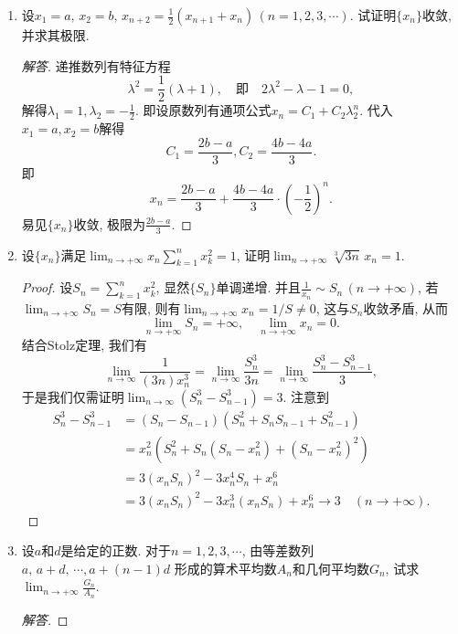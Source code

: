 \begin{2a}
\begin{enumerate}
\begin{proof}
若\(\ell=-\infty\), 我们记\(z_n=-x_n\), 于是\(\lim_{n\rightarrow\infty}z_n=0\)且
\[\lim_{n\rightarrow\infty}\frac{z_n-z_{n-1}}{y_n-y_{n-1}}=+\infty,\]
由上一段的讨论知\(\lim_{n\rightarrow\infty}\frac{z_n}{y_n}=+\infty\), 
从而\(\lim_{n\rightarrow\infty}\frac{x_n}{y_n}=-\infty.\)
\end{proof}
\item 设\(x_1=a,\,x_2=b,\,x_{n+2}=\frac{1}{2}(x_{n+1}+x_n)\,(n=1,2,3,\cdots)\). 试证明\(\{x_n\}\)收敛, 并求其极限.
\begin{proof}[解答]
递推数列有特征方程
\[\lambda^2=\frac{1}{2}(\lambda+1),\quad\text{即}\quad 2\lambda^2-\lambda-1=0,\]
解得\(\lambda_1=1,\lambda_2=-\frac{1}{2}\). 
即设原数列有通项公式\(x_n=C_1+C_2\lambda_2^n\). 代入\(x_1=a,x_2=b\)解得
\[C_1=\frac{2b-a}{3},C_2=\frac{4b-4a}{3}.\] 
即\[x_n=\frac{2b-a}{3}+\frac{4b-4a}{3}\cdot\left(-\frac{1}{2}\right)^n.\] 
易见\(\{x_n\}\)收敛, 极限为\(\frac{2b-a}{3}\).
\end{proof}
\item 设\(\{x_n\}\)满足\(\lim_{n\rightarrow+\infty}x_{n}\sum_{k=1}^{n}x_k^2=1\), 
证明\(\lim_{n\rightarrow+\infty}\sqrt[3]{3n}\,x_{n}=1\).
\begin{proof}
设\(S_n=\sum_{k=1}^{n}x_k^2\), 显然\(\{S_n\}\)单调递增. 
并且\(\frac{1}{x_n}\sim S_n\,(n\rightarrow+\infty)\), 
若\(\lim_{n\rightarrow+\infty}S_n=S\)有限, 
则有\(\lim_{n\rightarrow+\infty}x_n=1/S\ne 0\), 这与\(S_n\)收敛矛盾, 
从而\[\lim_{n\rightarrow+\infty}S_n=+\infty,\quad\lim_{n\rightarrow+\infty}x_n=0.\]
结合Stolz定理, 我们有\[\lim_{n\rightarrow\infty}\frac{1}{(3n)x_n^3}
=\lim_{n\rightarrow\infty}\frac{S_n^3}{3n}
=\lim_{n\rightarrow\infty}\frac{S_n^3-S_{n-1}^3}{3},\]
于是我们仅需证明\(\lim_{n\rightarrow\infty}\left(S_n^3-S_{n-1}^3\right)=3\). 
注意到\[\begin{aligned}
S_n^3-S_{n-1}^3&=(S_n-S_{n-1})\left(S_n^2+S_nS_{n-1}+S_{n-1}^2\right)\\
&=x_n^2\left(S_n^2+S_n\left(S_n-x_n^2\right)+\left(S_n-x_n^2\right)^2\right)\\
&=3\left(x_nS_n\right)^2-3x_n^4S_n+x_n^6\\
&=3\left(x_nS_n\right)^2-3x_n^3\left(x_nS_n\right)+x_n^6\rightarrow3\quad (n\rightarrow +\infty).
\end{aligned}\]
\end{proof}
\item 设\(a\)和\(d\)是给定的正数. 对于\(n=1,2,3,\cdots\), 
由等差数列\(a,\,a+d,\,\cdots,a+(n-1)d\) 形成的算术平均数\(A_n\)和几何平均数\(G_n\), 
试求\(\lim_{n\rightarrow+\infty}\frac{G_n}{A_n}\).
\begin{proof}[解答]

\end{proof}
\end{enumerate}
\end{2a}
